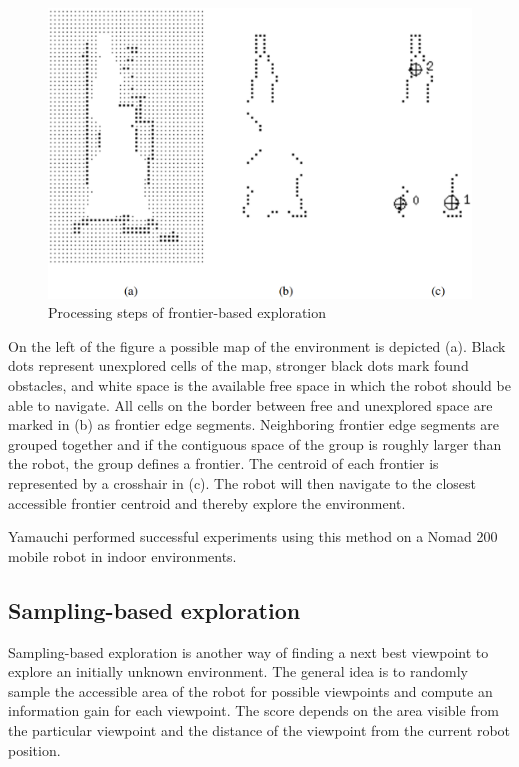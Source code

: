 \documentclass[a4paper,11pt,english]{article}
\begin{document}
\begin{figure}[h!]
	\begin{center}
		\includegraphics[width=.75\textwidth]{src/frontier_exploration.png}
		\caption{ Processing steps of frontier-based exploration \cite{yamauchi1997frontier}}
		\label{fig:frontier}
	\end{center}
\end{figure}

On the left of the figure a possible map of the environment is depicted (a).
Black dots represent unexplored cells of the map, stronger black dots mark found obstacles, and white space is the available free space in which the robot should be able to navigate.
All cells on the border between free and unexplored space are marked in (b) as frontier edge segments.
Neighboring frontier edge segments are grouped together and if the contiguous space of the group is roughly larger than the robot, the group defines a frontier.
The centroid of each frontier is represented by a crosshair in (c).
The robot will then navigate to the closest accessible frontier centroid and thereby explore the environment.

Yamauchi performed successful experiments using this method on a Nomad 200 mobile robot in indoor environments.

\subsection{Sampling-based exploration}
\label{Theoretical_background:Sampling-based_exploration}
Sampling-based exploration is another way of finding a next best viewpoint to explore an initially unknown environment.
The general idea is to randomly sample the accessible area of the robot for possible viewpoints and compute an information gain for each viewpoint.
The score depends on the area visible from the particular viewpoint and the distance of the viewpoint from the current robot position.
\end{document}
